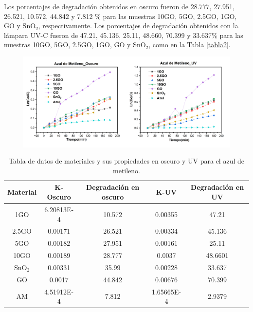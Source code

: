 \documentclass[12pt]{article}
\begin{document}
Los porcentajes de degradación obtenidos en oscuro fueron de 28.777, 27.951, 26.521, 10.572, 44.842 y 7.812 \% para las muestras 10GO, 5GO, 2.5GO, 1GO, GO y SnO$\displaystyle _{2}$, respectivamente.
Los porcentajes de degradación obtenidos con la lámpara UV-C fueron de 47.21, 45.136, 25.11, 48.660, 70.399 y 33.637\% para las muestras 10GO, 5GO, 2.5GO, 1GO, GO y SnO$\displaystyle _{2}$, como en la Tabla \ref{tabla2}. 


\begin{figure}[H]
    	   \begin{center}
     	  	\includegraphics[width = 1\textwidth]{Imagenes/MB/BM_UV_OSC.png}
    	   \end{center} 
        \end{figure}
\begin{table}[h]
\caption{Tabla de datos de materiales y sus propiedades en oscuro y UV para el azul de metileno.}
\centering
\begin{tabular}{|c|c|c|c|c|}
\hline
Material & K-Oscuro & Degradación en oscuro & K-UV & Degradación en UV\\
\hline
1GO & 6.20813E-4 & 10.572 & 0.00355 & 47.21\\
\hline
2.5GO & 0.00171 & 26.521 & 0.00334 & 45.136\\
\hline
5GO & 0.00182 & 27.951 & 0.00161 & 25.11\\
\hline
10GO & 0.00189 & 28.777 & 0.0037 & 48.6601\\
\hline
SnO$_{2}$ & 0.00331 & 35.99 & 0.00228 & 33.637\\
\hline
GO & 0.0017 & 44.842 & 0.00676 & 70.399\\
\hline
AM & 4.51912E-4 & 7.812 & 1.65665E-4 & 2.9379\\
\hline
\end{tabular}
\label{tab:tabla_SnO2GO_AM_OSC_UV}
\end{table}
\end{document}
